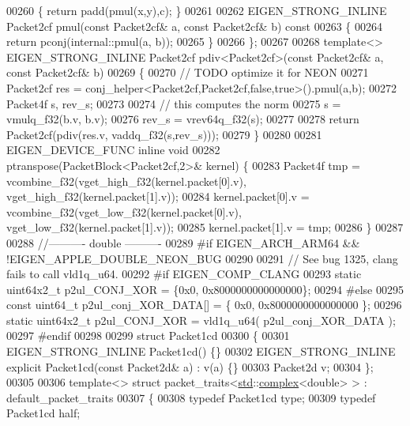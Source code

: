 \begin{DoxyCode}
00260 \textcolor{keyword}{  }\{ \textcolor{keywordflow}{return} padd(pmul(x,y),c); \}
00261 
00262   EIGEN\_STRONG\_INLINE Packet2cf pmul(\textcolor{keyword}{const} Packet2cf& a, \textcolor{keyword}{const} Packet2cf& b)\textcolor{keyword}{ const}
00263 \textcolor{keyword}{  }\{
00264     \textcolor{keywordflow}{return} pconj(internal::pmul(a, b));
00265   \}
00266 \};
00267 
00268 \textcolor{keyword}{template}<> EIGEN\_STRONG\_INLINE Packet2cf pdiv<Packet2cf>(\textcolor{keyword}{const} Packet2cf& a, \textcolor{keyword}{const} Packet2cf& b)
00269 \{
00270   \textcolor{comment}{// TODO optimize it for NEON}
00271   Packet2cf res = conj\_helper<Packet2cf,Packet2cf,false,true>().pmul(a,b);
00272   Packet4f s, rev\_s;
00273 
00274   \textcolor{comment}{// this computes the norm}
00275   s = vmulq\_f32(b.v, b.v);
00276   rev\_s = vrev64q\_f32(s);
00277 
00278   \textcolor{keywordflow}{return} Packet2cf(pdiv(res.v, vaddq\_f32(s,rev\_s)));
00279 \}
00280 
00281 EIGEN\_DEVICE\_FUNC \textcolor{keyword}{inline} \textcolor{keywordtype}{void}
00282 ptranspose(PacketBlock<Packet2cf,2>& kernel) \{
00283   Packet4f tmp = vcombine\_f32(vget\_high\_f32(kernel.packet[0].v), vget\_high\_f32(kernel.packet[1].v));
00284   kernel.packet[0].v = vcombine\_f32(vget\_low\_f32(kernel.packet[0].v), vget\_low\_f32(kernel.packet[1].v));
00285   kernel.packet[1].v = tmp;
00286 \}
00287 
00288 \textcolor{comment}{//---------- double ----------}
00289 \textcolor{preprocessor}{#if EIGEN\_ARCH\_ARM64 && !EIGEN\_APPLE\_DOUBLE\_NEON\_BUG}
00290 
00291 \textcolor{comment}{// See bug 1325, clang fails to call vld1q\_u64.}
00292 \textcolor{preprocessor}{#if EIGEN\_COMP\_CLANG}
00293   \textcolor{keyword}{static} uint64x2\_t p2ul\_CONJ\_XOR = \{0x0, 0x8000000000000000\};
00294 \textcolor{preprocessor}{#else}
00295   \textcolor{keyword}{const} uint64\_t  p2ul\_conj\_XOR\_DATA[] = \{ 0x0, 0x8000000000000000 \};
00296   \textcolor{keyword}{static} uint64x2\_t p2ul\_CONJ\_XOR = vld1q\_u64( p2ul\_conj\_XOR\_DATA );
00297 \textcolor{preprocessor}{#endif}
00298 
00299 \textcolor{keyword}{struct }Packet1cd
00300 \{
00301   EIGEN\_STRONG\_INLINE Packet1cd() \{\}
00302   EIGEN\_STRONG\_INLINE \textcolor{keyword}{explicit} Packet1cd(\textcolor{keyword}{const} Packet2d& a) : v(a) \{\}
00303   Packet2d v;
00304 \};
00305 
00306 \textcolor{keyword}{template}<> \textcolor{keyword}{struct }packet\_traits<\hyperlink{namespacestd}{std}::\hyperlink{structcomplex}{complex}<double> >  : default\_packet\_traits
00307 \{
00308   \textcolor{keyword}{typedef} Packet1cd type;
00309   \textcolor{keyword}{typedef} Packet1cd half;

\end{DoxyCode}
